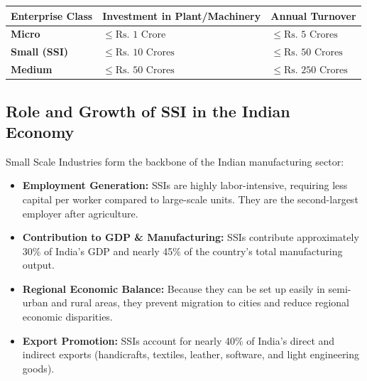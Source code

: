 \documentclass[12pt,a4paper]{article}
\renewcommand{\arraystretch}{1.45}
\begin{document}
\begin{tcolorbox}[defbox, title={Revised Composite MSME Classification (Post-2020)}]
\renewcommand{\arraystretch}{1.3}
\begin{tabularx}{\linewidth}{l B{3.8cm} Y}
\textbf{Enterprise Class} & \textbf{Investment in Plant/Machinery} & \textbf{Annual Turnover} \\
\midrule
\textbf{Micro} & $\le \text{Rs. } 1 \text{ Crore}$ & $\le \text{Rs. } 5 \text{ Crores}$ \\
\textbf{Small (SSI)} & $\le \text{Rs. } 10 \text{ Crores}$ & $\le \text{Rs. } 50 \text{ Crores}$ \\
\textbf{Medium} & $\le \text{Rs. } 50 \text{ Crores}$ & $\le \text{Rs. } 250 \text{ Crores}$ \\
\end{tabularx}
\end{tcolorbox}

\subsection{Role and Growth of SSI in the Indian Economy}
Small Scale Industries form the backbone of the Indian manufacturing sector:
\begin{itemize}[leftmargin=*, itemsep=3pt]
  \item \textbf{Employment Generation:} SSIs are highly labor-intensive, requiring less capital per worker compared to large-scale units. They are the second-largest employer after agriculture.
  \item \textbf{Contribution to GDP \& Manufacturing:} SSIs contribute approximately 30\% of India's GDP and nearly 45\% of the country's total manufacturing output.
  \item \textbf{Regional Economic Balance:} Because they can be set up easily in semi-urban and rural areas, they prevent migration to cities and reduce regional economic disparities.
  \item \textbf{Export Promotion:} SSIs account for nearly 40\% of India's direct and indirect exports (handicrafts, textiles, leather, software, and light engineering goods).
\end{itemize}
\end{document}
